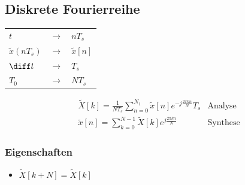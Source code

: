 \subsection{Diskrete Fourierreihe}
\begin{sectionbox}
    \begin{tabular*}{\columnwidth}{lcl}
        $t$ & $\rightarrow$ & $nT_s$ \\
        $\tilde x(nT_s)$ & $\rightarrow$ & $\tilde x[n]$ \\
        $\diff t$ & $\rightarrow$ & $T_s$ \\
        $T_0$ & $\rightarrow$ & $NT_s$ \\
    \end{tabular*}
    \begin{emphbox}
        \begin{align*}
             & \tilde X[k]=\frac{1}{NT_s}\sum_{n=0}^{N_1}\tilde x[n]e^{-j\frac{2\pi kn}{N}}T_s & \text{Analyse}  \\
             & \tilde x[n] = \sum_{k=0}^{N-1}\tilde X[k]e^{j\frac{2\pi kn}{N}}                 & \text{Synthese}
        \end{align*}
    \end{emphbox}

    \subsubsection{Eigenschaften}
    \begin{itemize}
        \item $\tilde X[k + N] = \tilde X[k]$
    \end{itemize}
\end{sectionbox}
